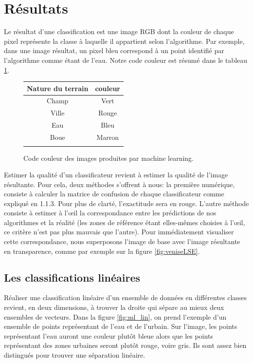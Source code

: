 \documentclass[a4paper,10pt]{article}
\begin{document}
\section{Résultats}
Le résultat d'une classification est une image RGB dont la couleur de chaque pixel représente la classe à laquelle il appartient selon l'algorithme. Par exemple, dans une image résultat, un pixel bleu correspond à un point identifié par l'algorithme comme étant de l'eau. Notre code couleur est résumé dans le tableau \ref{table:codeCouleur}.
\begin{figure}[H]
 \begin{center}
  \begin{tabular}{|c|c|}
    \hline
    Nature du terrain & couleur \\
    \hline
  Champ & Vert \\
  Ville &  Rouge \\
  Eau &  Bleu \\
  Boue & Marron \\
    \hline
  \label{table:codeCouleur}
  \end{tabular}
\caption{Code couleur des images produites par machine learning.} 
\end{center}
\end{figure}
Estimer la qualité d'un classificateur revient à estimer la qualité de l'image résultante. Pour cela, deux méthodes s'offrent à nous: la première numérique, consiste à calculer la matrice de confusion de chaque classificateur comme expliqué en 1.1.3. Pour plus de clarté, l'exactitude sera en rouge. L'autre méthode consiste à estimer à l'œil la correspondance entre les prédictions de nos algorithmes et la réalité (les zones de référence étant elles-mêmes choisies à l'œil, ce critère n'est pas plus mauvais que l'autre). Pour immédiatement visualiser cette correspondance, nous superposons l'image de base avec l'image résultante en transparence, comme par exemple sur la figure \ref{fig:veniseLSE}.

 \subsection{Les classifications linéaires}
 
 Réaliser une classification linéaire d'un ensemble de données en différentes classes revient, en deux dimensions, à trouver la droite qui sépare au mieux deux ensembles de vecteurs. Dans la figure \ref{fig:ml_lin}, on prend l'exemple d'un ensemble de points représentant de l'eau et de l'urbain. Sur l'image, les points représentant l'eau auront une couleur plutôt bleue alors que les points représentant des zones urbaines seront plutôt rouge, voire gris. Ils sont assez bien distingués pour trouver une séparation linéaire.
\end{document}
